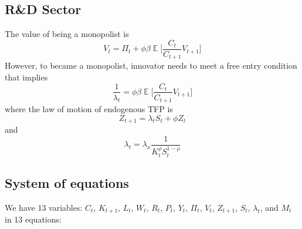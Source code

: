 \documentclass{article}
\DeclareMathOperator{\E}{\mathbb{E}}
\begin{document}
\subsection{R\&D Sector}

The value of being a monopolist is
\begin{equation}
V_t = \Pi_t + \phi \beta \E \bigg[ \frac{C_t}{C_{t+1}}  V_{t+1} \bigg]
\end{equation}
However, to became a monopolist, innovator needs to meet a free entry condition that implies
\begin{equation}
\frac{1}{\lambda_t} = \phi \beta \E \bigg[ \frac{C_t}{C_{t+1}}  V_{t+1} \bigg]
\end{equation}
where the law of motion of endogenous TFP is
\begin{equation}
Z_{t+1} = \lambda_t S_t + \phi Z_t
\end{equation}
and
\begin{equation}
\lambda_t = \lambda_x \frac{1}{K_t^{\rho}S_t^{1 - \rho}}
\end{equation}

\subsection{System of equations}

We have 13 variables: $C_t$, $K_{t+1}$, $L_t$, $W_t$, $R_t$, $P_t$, $Y_t$, $\Pi_t$, $V_t$, $Z_{t+1}$, $S_t$, $\lambda_t$, and $M_t$ in 13 equations:
\end{document}
